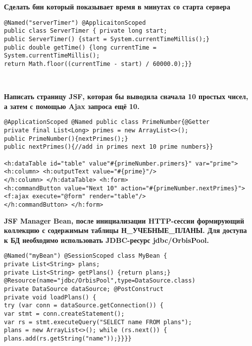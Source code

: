 \documentclass{article}
\begin{document}
\hfill
\begin{minipage}[t]{0.3\textwidth}
    \textbf{Сделать бин который показывает время в минутах со старта сервера}
    \begin{lstlisting}[frame=single, basicstyle=\tiny\ttfamily, breaklines=true, breakatwhitespace=true, postbreak=\mbox{\textcolor{red}{$\hookrightarrow$}\space}]
@Named("serverTimer") @ApplicaitonScoped
public class ServerTimer { private long start;
public ServerTimer() {start = System.currentTimeMillis();}
public double getTime() {long currentTime = System.currentTimeMillis();
return Math.floor((currentTime - start) / 60000.0);}}
    \end{lstlisting}
\end{minipage}%
\\ 

\begin{minipage}[t]{0.3\textwidth}
    \textbf{Написать страницу JSF, которая бы выводила сначала 10 простых чисел, а затем с помощью Ajax запроса ещё 10.}
    \begin{lstlisting}[frame=single, basicstyle=\tiny\ttfamily, breaklines=true, breakatwhitespace=true, postbreak=\mbox{\textcolor{red}{$\hookrightarrow$}\space}]
@ApplicationScoped @Named public class PrimeNumber{@Getter
private final List<Long> primes = new ArrayList<>();
public PrimeNumber(){nextPrimes();}
public nextPrimes(){//add in primes next 10 prime numbers}}

<h:dataTable id="table" value"#{primeNumber.primers}" var="prime">
<h:column> <h:outputText value="#{prime}"/>
</h:column> </h:dataTable> <h:form>
<h:commandButton value="Next 10" action="#{primeNumber.nextPrimes}">
<f:ajax execute="@form" render="table"/>
</h:commandButton> </h:form>
    \end{lstlisting}
\end{minipage}%
\hfill
\begin{minipage}[t]{0.3\textwidth}
    \textbf{JSF Manager Bean, после инициализации HTTP-сессии формирующий коллекцию с содержимым таблицы Н\_УЧЕБНЫЕ\_ПЛАНЫ. Для доступа к БД необходимо использовать JDBC-ресурс jdbc/OrbisPool.}
    \begin{lstlisting}[frame=single, basicstyle=\tiny\ttfamily, breaklines=true, breakatwhitespace=true, postbreak=\mbox{\textcolor{red}{$\hookrightarrow$}\space}]
@Named("myBean") @SessionScoped class MyBean {
private List<String> plans;
private List<String> getPlans() {return plans;}
@Resource(name="jdbc/OrbisPool",type=DataSource.class)
private DataSource dataSource; @PostConstruct
private void loadPlans() {
try (var conn = dataSource.getConnection()) {
var stmt = conn.createStatement();
var rs = stmt.executeQuery("SELECT name FROM plans");
plans = new ArrayList<>(); while (rs.next()) {
plans.add(rs.getString("name"));}}}}
    \end{lstlisting}
\end{minipage}%
\end{document}
